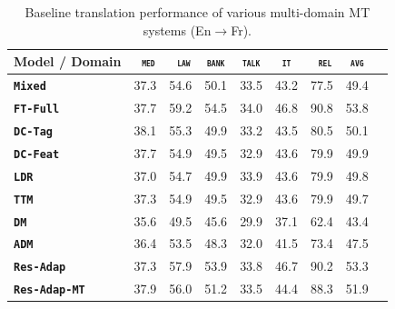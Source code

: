 \documentclass[11pt,a4paper]{article}
\newcommand{\domain}[1]{\texttt{\textsc{#1}}}
\newcommand{\system}[1]{\texttt{\textbf{#1}}}
\begin{document}
\begin{table}[t!]
  \centering
  \begin{tabular}{|p{3cm}|*{8}{r|}} \hline
    Model / Domain & \multicolumn{1}{c|}{\domain{ med}} & \multicolumn{1}{c|}{\domain{ law}} & \multicolumn{1}{c|}{\domain{bank}} & \multicolumn{1}{c|}{\domain{talk}} & \multicolumn{1}{c|}{\domain{ it }} & \multicolumn{1}{c|}{\domain{ rel}} & \multicolumn{1}{c|}{\domain{avg}} \\ \hline 
    \system{Mixed}        & 37.3 & 54.6 & 50.1 & 33.5 & 43.2 & 77.5  &  49.4 \\
    \system{FT-Full}       & 37.7 & 59.2 & 54.5 & 34.0 & 46.8 & 90.8 & 53.8 \\
    \hline 
    \system{DC-Tag}      & 38.1 & 55.3 & 49.9   & 33.2 & 43.5 & 80.5  & 50.1 \\
    \system{DC-Feat}     & 37.7 & 54.9 & 49.5   & 32.9 & 43.6 & 79.9 & 49.9  \\
    \system{LDR}            & 37.0  & 54.7 & 49.9 & 33.9 & 43.6 & 79.9 & 49.8    \\
    \system{TTM}           & 37.3  & 54.9 & 49.5 & 32.9 & 43.6 & 79.9 & 49.7   \\
    \system{DM}            & 35.6  & 49.5  & 45.6 & 29.9 & 37.1 & 62.4 & 43.4   \\ 
    \system{ADM}          & 36.4  & 53.5  & 48.3 & 32.0 & 41.5 & 73.4 & 47.5   \\
    \hline
    \system{Res-Adap}         & 37.3 & 57.9 & 53.9 & 33.8 & 46.7 & 90.2 & 53.3 \\ 
    \system{Res-Adap-MT}  & 37.9 & 56.0 & 51.2  & 33.5 & 44.4 & 88.3 & 51.9 \\
    \hline
  \end{tabular}
  \caption{Baseline translation performance of various multi-domain MT systems (En$\rightarrow$Fr).}
  \label{tab:performance-multi}
\end{table}
\end{document}
